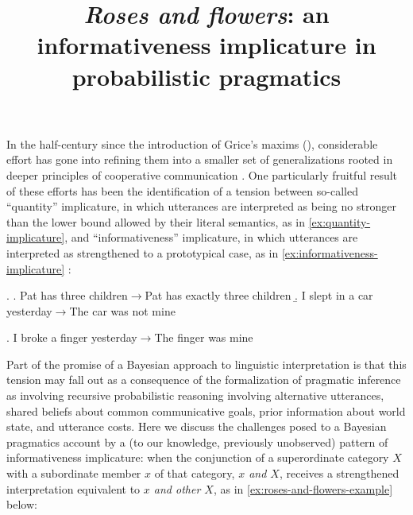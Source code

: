 \documentclass[11pt]{article}
\title{\vspace{-1.5cm}\large \bf \emph{Roses and flowers}: an informativeness implicature in
  probabilistic pragmatics\vspace{-2cm}}
\date{}
\begin{document}
\maketitle

\noindent
In the half-century since the introduction of Grice's maxims
(\citeyear{grice:1957,grice:1975}), considerable effort has gone
into refining them into a smaller set of generalizations rooted in
deeper principles of cooperative communication \citep[inter
alia]{horn:1984,sperber-wilson:1986,levinson:2000}. One particularly
fruitful result of these efforts has been the identification of a
tension between so-called ``quantity'' implicature, in which
utterances are interpreted as being no stronger than the lower bound
allowed by their literal semantics, as in \ref{ex:quantity-implicature}, and
``informativeness'' implicature, in which utterances are interpreted
as strengthened to a prototypical case, as in
\ref{ex:informativeness-implicature}
\citep{atlas-levinson:1981,horn:1984}:

\ex. \label{ex:quantity-implicature}
\a. Pat has three children$\rightarrow$Pat has exactly three children
\b. I slept in a car yesterday$\rightarrow$The car was not mine 

\ex. I broke a finger yesterday$\rightarrow$The finger was mine \label{ex:informativeness-implicature}

Part of the promise of a Bayesian approach to linguistic
interpretation is that this tension may fall out as a consequence of
the formalization of pragmatic inference as involving recursive
probabilistic reasoning involving alternative utterances, shared
beliefs about common communicative goals, prior information about
world state, and utterance costs.  Here we discuss the challenges
posed to a Bayesian pragmatics account by a (to our knowledge,
previously unobserved) pattern of informativeness implicature: when
the conjunction of a superordinate category $X$ with a subordinate
member $x$ of that category, \emph{$x$ and $X$}, receives a
strengthened interpretation equivalent to \emph{$x$ and other $X$}, as
in \ref{ex:roses-and-flowers-example} below:
\end{document}
